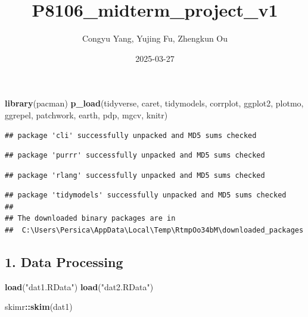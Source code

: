 \documentclass[
]{article}
\title{P8106\_midterm\_project\_v1}
\author{Congyu Yang, Yujing Fu, Zhengkun Ou}
\date{2025-03-27}
\newenvironment{Shaded}{\begin{snugshade}}{\end{snugshade}}
\newcommand{\FunctionTok}[1]{\textcolor[rgb]{0.13,0.29,0.53}{\textbf{#1}}}
\newcommand{\NormalTok}[1]{#1}
\newcommand{\SpecialCharTok}[1]{\textcolor[rgb]{0.81,0.36,0.00}{\textbf{#1}}}
\newcommand{\StringTok}[1]{\textcolor[rgb]{0.31,0.60,0.02}{#1}}
\begin{document}
\maketitle

\begin{Shaded}
\begin{Highlighting}[]
\FunctionTok{library}\NormalTok{(pacman)}
\FunctionTok{p\_load}\NormalTok{(tidyverse, caret, tidymodels, corrplot, ggplot2, plotmo, ggrepel, patchwork, earth, pdp, mgcv, knitr)}
\end{Highlighting}
\end{Shaded}

\begin{verbatim}
## package 'cli' successfully unpacked and MD5 sums checked
\end{verbatim}

\begin{verbatim}
## package 'purrr' successfully unpacked and MD5 sums checked
\end{verbatim}

\begin{verbatim}
## package 'rlang' successfully unpacked and MD5 sums checked
\end{verbatim}

\begin{verbatim}
## package 'tidymodels' successfully unpacked and MD5 sums checked
## 
## The downloaded binary packages are in
##  C:\Users\Persica\AppData\Local\Temp\RtmpOo34bM\downloaded_packages
\end{verbatim}

\subsection{1. Data Processing}\label{data-processing}

\begin{Shaded}
\begin{Highlighting}[]
\FunctionTok{load}\NormalTok{(}\StringTok{"dat1.RData"}\NormalTok{)}
\FunctionTok{load}\NormalTok{(}\StringTok{"dat2.RData"}\NormalTok{)}
\end{Highlighting}
\end{Shaded}

\begin{Shaded}
\begin{Highlighting}[]
\NormalTok{skimr}\SpecialCharTok{::}\FunctionTok{skim}\NormalTok{(dat1)}
\end{Highlighting}
\end{Shaded}
\end{document}
